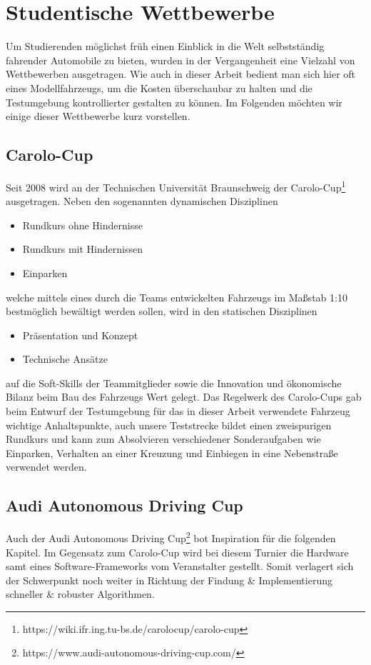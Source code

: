 \section{Studentische Wettbewerbe \dcsecondauthorshort}
Um Studierenden möglichst früh einen Einblick in die Welt selbstständig fahrender Automobile zu bieten, wurden in der Vergangenheit eine Vielzahl von Wettbewerben ausgetragen. Wie auch in dieser Arbeit bedient man sich hier oft eines Modellfahrzeugs, um die Kosten überschaubar zu halten und die Testumgebung kontrollierter gestalten zu können. Im Folgenden möchten wir einige dieser Wettbewerbe kurz vorstellen.
\subsection{Carolo-Cup}
\label{sssec:carolo_cup}
Seit 2008 wird an der Technischen Universität Braunschweig der Carolo-Cup\footnote{https://wiki.ifr.ing.tu-bs.de/carolocup/carolo-cup} ausgetragen. Neben den sogenannten dynamischen Disziplinen
\begin{itemize}
\item Rundkurs ohne Hindernisse
\item Rundkurs mit Hindernissen
\item Einparken
\end{itemize}
welche mittels eines durch die Teams entwickelten Fahrzeugs im Maßstab 1:10 bestmöglich bewältigt werden sollen, wird in den statischen Disziplinen
\begin{itemize}
\item Präsentation und Konzept
\item Technische Ansätze
\end{itemize}
auf die Soft-Skills der Teammitglieder sowie die Innovation und ökonomische Bilanz beim Bau des Fahrzeugs Wert gelegt. Das Regelwerk des Carolo-Cups gab beim Entwurf der Testumgebung für das in dieser Arbeit verwendete Fahrzeug wichtige Anhaltspunkte, auch unsere Teststrecke bildet einen zweispurigen Rundkurs und kann zum Absolvieren verschiedener Sonderaufgaben wie Einparken, Verhalten an einer Kreuzung und Einbiegen in eine Nebenstraße verwendet werden.

\subsection{Audi Autonomous Driving Cup}
Auch der Audi Autonomous Driving Cup\footnote{https://www.audi-autonomous-driving-cup.com/} bot Inspiration für die folgenden Kapitel. Im Gegensatz zum Carolo-Cup wird bei diesem Turnier die Hardware samt eines Software-Frameworks vom Veranstalter gestellt. Somit verlagert sich der Schwerpunkt noch weiter in Richtung der Findung \& Implementierung schneller \& robuster Algorithmen. 

